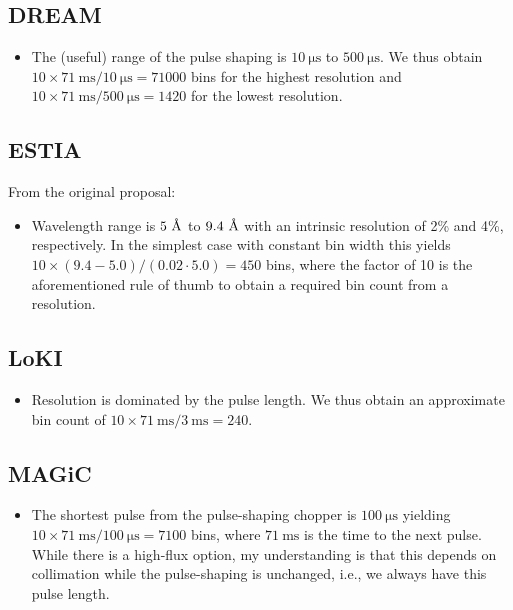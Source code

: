 \documentclass[a4paper,english,numbers=noenddot,bibliography=totoc,chapterprefix=on,DIV=12]{scrartcl}
\newcommand{\angstrom}{\textup{\AA}}
\newcommand{\dream}{DREAM\xspace}
\newcommand{\estia}{ESTIA\xspace}
\newcommand{\loki}{LoKI\xspace}
\newcommand{\magic}{MAGiC\xspace}
\begin{document}
\subsection{\dream}

\begin{itemize}
  \item The (useful) range of the pulse shaping is $10~\mathrm{\mu s}$ to $500~\mathrm{\mu s}$.
    We thus obtain $10\times71~\mathrm{ms}/10~\mathrm{\mu s} = 71000$ bins for the highest resolution and $10\times71~\mathrm{ms}/500~\mathrm{\mu s} = 1420$ for the lowest resolution.
\end{itemize}


\subsection{\estia}

From the original proposal:

\begin{itemize}
  \item Wavelength range is $5~\angstrom$ to $9.4~\angstrom$ with an intrinsic resolution of 2\% and 4\%, respectively.
    In the simplest case with constant bin width this yields $10\times(9.4-5.0)/(0.02\cdot5.0) = 450$ bins, where the factor of 10 is the aforementioned rule of thumb to obtain a required bin count from a resolution.
\end{itemize}


\subsection{\loki}

\begin{itemize}
  \item Resolution is dominated by the pulse length.
    We thus obtain an approximate bin count of  $10\times71~\mathrm{ms}/3~\mathrm{ms} = 240$.
\end{itemize}


\subsection{\magic}

\begin{itemize}
  \item The shortest pulse from the pulse-shaping chopper is $100~\mathrm{\mu s}$ yielding $10\times71~\mathrm{ms}/100~\mathrm{\mu s} = 7100$ bins, where $71~\mathrm{ms}$ is the time to the next pulse.
    While there is a high-flux option, my understanding is that this depends on collimation while the pulse-shaping is unchanged, i.e., we always have this pulse length.
\end{itemize}
\end{document}
